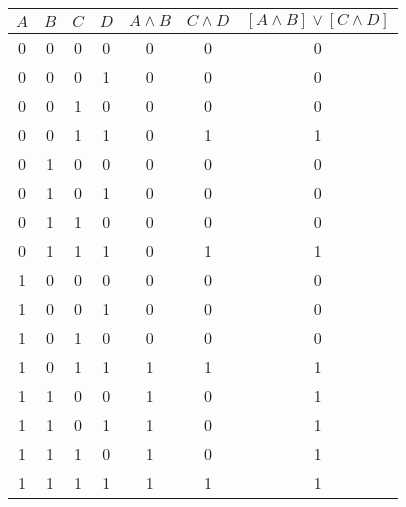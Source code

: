 \documentclass[10pt,a4paper]{article}
\begin{document}
\begin{tabular}{|c|c|c|c|c|c|c|}
\hline
$A$ & $B$ & $C$ & $D$ & $A \wedge B$ & $C \wedge D$ & $[A \wedge B]\vee[C \wedge D]$\\
\hline
0 & 0 & 0 & 0 & 0 & 0 & 0 \\

0 & 0 & 0 & 1 & 0 & 0 & 0 \\
0 & 0 & 1 & 0 & 0 & 0 & 0 \\
0 & 0 & 1 & 1 & 0 & 1 & 1 \\
0 & 1 & 0 & 0 & 0 & 0 & 0 \\
0 & 1 & 0 & 1 & 0 & 0 & 0 \\
0 & 1 & 1 & 0 & 0 & 0 & 0 \\
0 & 1 & 1 & 1 & 0 & 1 & 1 \\
1 & 0 & 0 & 0 & 0 & 0 & 0 \\
1 & 0 & 0 & 1 & 0 & 0 & 0 \\
1 & 0 & 1 & 0 & 0 & 0 & 0 \\
1 & 0 & 1 & 1 & 1 & 1 & 1 \\
1 & 1 & 0 & 0 & 1 & 0 & 1 \\
1 & 1 & 0 & 1 & 1 & 0 & 1 \\
1 & 1 & 1 & 0 & 1 & 0 & 1 \\
1 & 1 & 1 & 1 & 1 & 1 & 1 \\
\hline
\end{tabular}
\end{document}
